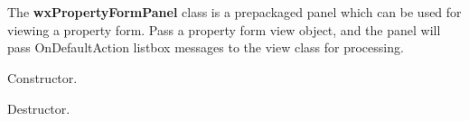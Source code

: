 \section{}\label{wxpropertyformpanel}

The {\bf wxPropertyFormPanel} class is a prepackaged panel which can
be used for viewing a property form. Pass a property form view object, and the panel
will pass OnDefaultAction listbox messages to the view class for
processing.



Constructor.



Destructor.



